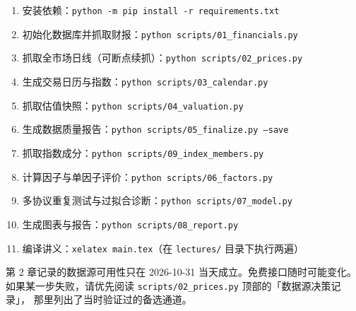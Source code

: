 \begin{enumerate}
  \item 安装依赖：\texttt{python -m pip install -r requirements.txt}
  \item 初始化数据库并抓取财报：\texttt{python scripts/01\_financials.py}
  \item 抓取全市场日线（可断点续抓）：\texttt{python scripts/02\_prices.py}
  \item 生成交易日历与指数：\texttt{python scripts/03\_calendar.py}
  \item 抓取估值快照：\texttt{python scripts/04\_valuation.py}
  \item 生成数据质量报告：\texttt{python scripts/05\_finalize.py --save}
  \item 抓取指数成分：\texttt{python scripts/09\_index\_members.py}
  \item 计算因子与单因子评价：\texttt{python scripts/06\_factors.py}
  \item 多协议重复测试与过拟合诊断：\texttt{python scripts/07\_model.py}
  \item 生成图表与报告：\texttt{python scripts/08\_report.py}
  \item 编译讲义：\texttt{xelatex main.tex}（在 \texttt{lectures/} 目录下执行两遍）
\end{enumerate}

\begin{warnbox}[关于数据源的时效性]
第 2 章记录的数据源可用性只在 2026-10-31 当天成立。免费接口随时可能变化。
如果某一步失败，请优先阅读 \texttt{scripts/02\_prices.py} 顶部的「数据源决策记录」，
那里列出了当时验证过的备选通道。
\end{warnbox}
